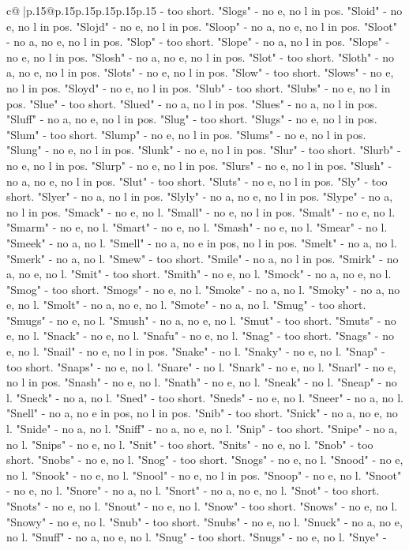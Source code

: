 \documentclass{article}
\begin{document}
{\begin{supertabular}{c@{$\;$}|p{.15\linewidth}@{}p{.15\linewidth}p{.15\linewidth}p{.15\linewidth}p{.15\linewidth}p{.15\linewidth}}
{{{{-} too short. "Slogs" {-} no e, no l in pos. "Sloid" {-} no e, no l in pos. "Slojd" {-} no e, no l in pos. "Sloop" {-} no a, no e, no l in pos. "Sloot" {-} no a, no e, no l in pos. "Slop" {-} too short. "Slope" {-} no a, no l in pos. "Slops" {-} no e, no l in pos. "Slosh" {-} no a, no e, no l in pos. "Slot" {-} too short. "Sloth" {-} no a, no e, no l in pos. "Slots" {-} no e, no l in pos. "Slow" {-} too short. "Slows" {-} no e, no l in pos. "Sloyd" {-} no e, no l in pos. "Slub" {-} too short. "Slubs" {-} no e, no l in pos. "Slue" {-} too short. "Slued" {-} no a, no l in pos. "Slues" {-} no a, no l in pos. "Sluff" {-} no a, no e, no l in pos. "Slug" {-} too short. "Slugs" {-} no e, no l in pos. "Slum" {-} too short. "Slump" {-} no e, no l in pos. "Slums" {-} no e, no l in pos. "Slung" {-} no e, no l in pos. "Slunk" {-} no e, no l in pos. "Slur" {-} too short. "Slurb" {-} no e, no l in pos. "Slurp" {-} no e, no l in pos. "Slurs" {-} no e, no l in pos. "Slush" {-} no a, no e, no l in pos. "Slut" {-} too short. "Sluts" {-} no e, no l in pos. "Sly" {-} too short. "Slyer" {-} no a, no l in pos. "Slyly" {-} no a, no e, no l in pos. "Slype" {-} no a, no l in pos. "Smack" {-} no e, no l. "Small" {-} no e, no l in pos. "Smalt" {-} no e, no l. "Smarm" {-} no e, no l. "Smart" {-} no e, no l. "Smash" {-} no e, no l. "Smear" {-} no l. "Smeek" {-} no a, no l. "Smell" {-} no a, no e in pos, no l in pos. "Smelt" {-} no a, no l. "Smerk" {-} no a, no l. "Smew" {-} too short. "Smile" {-} no a, no l in pos. "Smirk" {-} no a, no e, no l. "Smit" {-} too short. "Smith" {-} no e, no l. "Smock" {-} no a, no e, no l. "Smog" {-} too short. "Smogs" {-} no e, no l. "Smoke" {-} no a, no l. "Smoky" {-} no a, no e, no l. "Smolt" {-} no a, no e, no l. "Smote" {-} no a, no l. "Smug" {-} too short. "Smugs" {-} no e, no l. "Smush" {-} no a, no e, no l. "Smut" {-} too short. "Smuts" {-} no e, no l. "Snack" {-} no e, no l. "Snafu" {-} no e, no l. "Snag" {-} too short. "Snags" {-} no e, no l. "Snail" {-} no e, no l in pos. "Snake" {-} no l. "Snaky" {-} no e, no l. "Snap" {-} too short. "Snaps" {-} no e, no l. "Snare" {-} no l. "Snark" {-} no e, no l. "Snarl" {-} no e, no l in pos. "Snash" {-} no e, no l. "Snath" {-} no e, no l. "Sneak" {-} no l. "Sneap" {-} no l. "Sneck" {-} no a, no l. "Sned" {-} too short. "Sneds" {-} no e, no l. "Sneer" {-} no a, no l. "Snell" {-} no a, no e in pos, no l in pos. "Snib" {-} too short. "Snick" {-} no a, no e, no l. "Snide" {-} no a, no l. "Sniff" {-} no a, no e, no l. "Snip" {-} too short. "Snipe" {-} no a, no l. "Snips" {-} no e, no l. "Snit" {-} too short. "Snits" {-} no e, no l. "Snob" {-} too short. "Snobs" {-} no e, no l. "Snog" {-} too short. "Snogs" {-} no e, no l. "Snood" {-} no e, no l. "Snook" {-} no e, no l. "Snool" {-} no e, no l in pos. "Snoop" {-} no e, no l. "Snoot" {-} no e, no l. "Snore" {-} no a, no l. "Snort" {-} no a, no e, no l. "Snot" {-} too short. "Snots" {-} no e, no l. "Snout" {-} no e, no l. "Snow" {-} too short. "Snows" {-} no e, no l. "Snowy" {-} no e, no l. "Snub" {-} too short. "Snubs" {-} no e, no l. "Snuck" {-} no a, no e, no l. "Snuff" {-} no a, no e, no l. "Snug" {-} too short. "Snugs" {-} no e, no l. "Snye" {-} }}}
\end{supertabular}}
\end{document}
